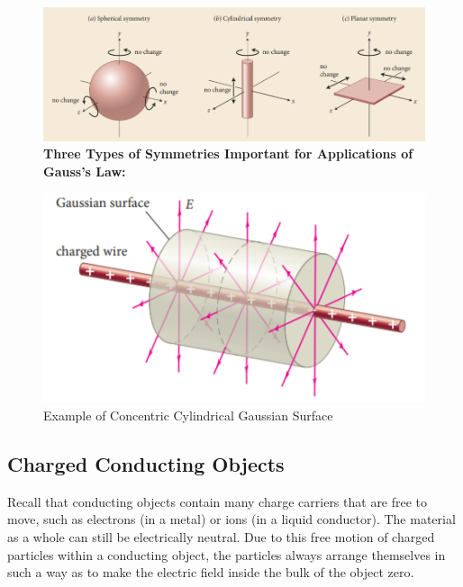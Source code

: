         \begin{figure}[hbt!]
            \centering
            \caption*{\textbf{Three Types of Symmetries Important for Applications of Gauss's Law:}}
            \includegraphics[scale = 0.75]{Resources/24.4_Symmetries}
        \end{figure}

        \begin{figure}[hbt!]
            \centering
            \caption*{Example of Concentric Cylindrical Gaussian Surface}
            \includegraphics[scale = 0.75]{Resources/24.4_Cylindrical_Gaussian_Surface}
        \end{figure}

    \subsection{Charged Conducting Objects} %

        Recall that conducting objects contain many charge carriers that are free to move, such as electrons (in a metal) or ions (in a liquid conductor). The material as a whole can still be electrically neutral. Due
        to this free motion of charged particles within a conducting object, the particles always arrange themselves in such a way as to make the electric field inside the bulk of the object zero. \\

